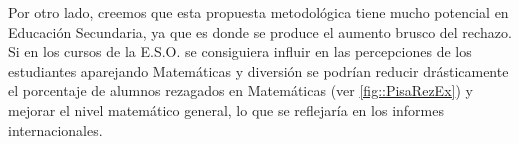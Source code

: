 Por otro lado, creemos que esta propuesta metodológica tiene mucho potencial en Educación Secundaria, ya que es donde se produce el aumento brusco del rechazo.
%
Si en los cursos de la E.S.O. se consiguiera influir en las percepciones de los estudiantes aparejando Matemáticas y diversión se podrían reducir drásticamente el porcentaje de alumnos rezagados en Matemáticas (ver \ref{fig::PisaRezEx}) y mejorar el nivel matemático general, lo que se reflejaría en los informes internacionales.

